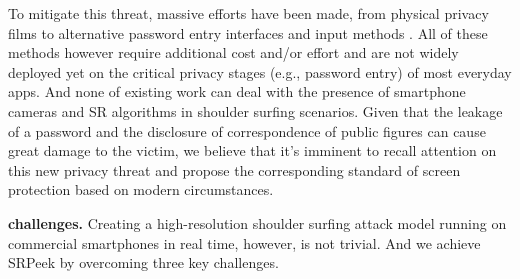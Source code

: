 
To mitigate this threat, massive efforts have been made, from physical privacy films to alternative password entry interfaces \cite{wiedenbeck2006design,papadopoulos2017illusionpin} and input methods \cite{kumar2007reducing}. All of these methods however require additional cost and/or effort \cite{Chun2019Keep} and are not widely deployed yet on the critical privacy stages (e.g., password entry) of most everyday apps. And none of existing work can deal with the presence of smartphone cameras and SR algorithms in shoulder surfing scenarios. Given that the leakage of a password and the disclosure of correspondence of public figures can cause great damage to the victim, we believe that it's imminent to recall attention on this new privacy threat and propose the corresponding standard of screen protection based on modern circumstances.

\vspace{1mm}
\noindent
\textbf{challenges.} Creating a high-resolution shoulder surfing attack model running on commercial smartphones in real time, however, is not trivial. And we achieve \textsf{SRPeek} by overcoming three key challenges.

